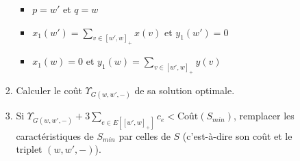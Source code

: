\begin{enumerate}
\begin{enumerate}
\begin{enumerate}
\begin{itemize}
      \item $p=w'$ et $q=w$
      \item $x_1(w') = \sum_{v \in \left[w',w\right]_+} x(v)$ et $y_1(w') = 0$
      \item $x_1(w) = 0$ et $y_1(w) = \sum_{v \in \left[w',w\right]_+} y(v)$
      \end{itemize}
    \item Calculer le coût $\Upsilon_{G(w,w',-)}$ de sa solution optimale.
    \item Si $\Upsilon_{G(w,w',-)} + 3 \sum_{ e \in E\left[ \left[w',w\right]_+ \right] }c_e < \mbox{Coût}(S_{min})$, remplacer les caractéristiques de $S_{min}$ par celles de $S$ (c'est-à-dire son coût et le triplet $(w,w',-)$).
    \end{enumerate}
  \end{enumerate}
\end{enumerate}


